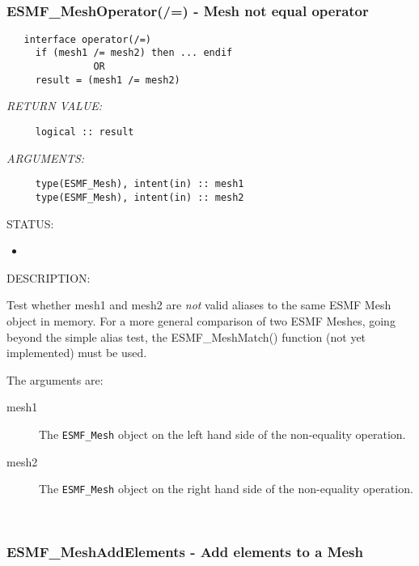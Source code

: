 
\mbox{}\hrulefill\ 
 
\subsubsection [ESMF\_MeshOperator(/=)] {ESMF\_MeshOperator(/=) - Mesh not equal operator}


  
\begin{verbatim}   interface operator(/=)
     if (mesh1 /= mesh2) then ... endif
               OR
     result = (mesh1 /= mesh2)\end{verbatim}{\em RETURN VALUE:}
\begin{verbatim}     logical :: result\end{verbatim}{\em ARGUMENTS:}
\begin{verbatim}     type(ESMF_Mesh), intent(in) :: mesh1
     type(ESMF_Mesh), intent(in) :: mesh2\end{verbatim}
{\sf STATUS:}
   \begin{itemize}
   \item{}
   \end{itemize}
  
{\sf DESCRIPTION:\\ }


     Test whether mesh1 and mesh2 are {\it not} valid aliases to the
     same ESMF Mesh object in memory. For a more general comparison of two ESMF
     Meshes, going beyond the simple alias test, the ESMF\_MeshMatch() function
     (not yet implemented) must be used.
  
     The arguments are:
     \begin{description}
     \item[mesh1]
       The {\tt ESMF\_Mesh} object on the left hand side of the non-equality
       operation.
     \item[mesh2]
       The {\tt ESMF\_Mesh} object on the right hand side of the non-equality
       operation.
     \end{description}
   
 
\mbox{}\hrulefill\ 
 
\subsubsection [ESMF\_MeshAddElements] {ESMF\_MeshAddElements - Add elements to a Mesh \label{sec:mesh:api:meshaddelements}}


